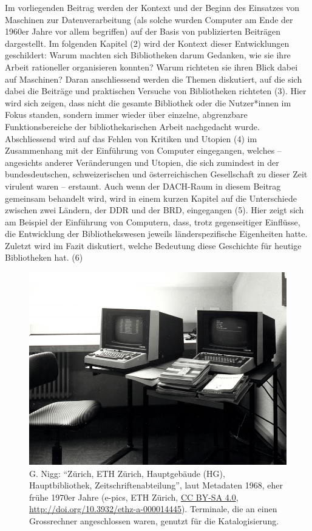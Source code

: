 \documentclass[a4paper,
fontsize=11pt,
oneside,
numbers=noperiodatend,
parskip=half-,
bibliography=totoc,
final
]{scrartcl}
\begin{document}
Im vorliegenden Beitrag werden der Kontext und der Beginn des Einsatzes
von Maschinen zur Datenverarbeitung (als solche wurden Computer am Ende
der 1960er Jahre vor allem begriffen) auf der Basis von publizierten
Beiträgen dargestellt. Im folgenden Kapitel (2) wird der Kontext dieser
Entwicklungen geschildert: Warum machten sich Bibliotheken darum
Gedanken, wie sie ihre Arbeit rationeller organisieren konnten? Warum
richteten sie ihren Blick dabei auf Maschinen? Daran anschliessend
werden die Themen diskutiert, auf die sich dabei die Beiträge und
praktischen Versuche von Bibliotheken richteten (3). Hier wird sich
zeigen, dass nicht die gesamte Bibliothek oder die Nutzer*innen im Fokus
standen, sondern immer wieder über einzelne, abgrenzbare
Funktionsbereiche der bibliothekarischen Arbeit nachgedacht wurde.
Abschliessend wird auf das Fehlen von Kritiken und Utopien (4) im
Zusammenhang mit der Einführung von Computer eingegangen, welches --
angesichts anderer Veränderungen und Utopien, die sich zumindest in der
bundesdeutschen, schweizerischen und österreichischen Gesellschaft zu
dieser Zeit virulent waren -- erstaunt. Auch wenn der DACH-Raum in
diesem Beitrag gemeinsam behandelt wird, wird in einem kurzen Kapitel
auf die Unterschiede zwischen zwei Ländern, der DDR und der BRD,
eingegangen (5). Hier zeigt sich am Beispiel der Einführung von
Computern, dass, trotz gegenseitiger Einflüsse, die Entwicklung der
Bibliothekswesen jeweils länderspezifische Eigenheiten hatte. Zuletzt
wird im Fazit diskutiert, welche Bedeutung diese Geschichte für heutige
Bibliotheken hat. (6)

\begin{figure}
\centering
\includegraphics[width=.7\textwidth]{img/ETHZuerich01.jpg}
\caption{G. Nigg: \enquote{Zürich, ETH Zürich, Hauptgebäude
(HG), Hauptbibliothek, Zeitschriftenabteilung}, laut Metadaten 1968,
eher frühe 1970er Jahre (e-pics, ETH Zürich, \href{https://creativecommons.org/licenses/by-sa/4.0/}{CC BY-SA 4.0},
\url{http://doi.org/10.3932/ethz-a-000014445}). Terminale, die an einen
Grossrechner angeschlossen waren, genutzt für die Katalogisierung.}
\end{figure}
\end{document}
